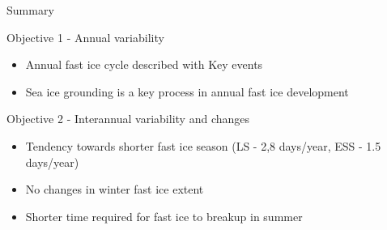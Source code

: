 \documentclass[8pt]{beamer}
\begin{document}
\setwatermark{\fontsize{125pt}{125pt}\selectfont{}}
\begin{frame}{Summary}
	\begin{block}{Objective 1 -  Annual variability}
		\begin{itemize}
			\item Annual fast ice cycle described with Key events
			\item Sea ice grounding is a key process in annual fast ice development
		\end{itemize}
	\end{block}
	\begin{block}{Objective 2 - Interannual variability and changes}
		\begin{itemize}
			\item Tendency towards shorter fast ice season (LS - 2,8 days/year, ESS - 1.5 days/year)
			\item No changes in winter fast ice extent
			\item Shorter time required for fast ice to breakup in summer 
		\end{itemize}
	\end{block}
\end{frame}

\end{document}
